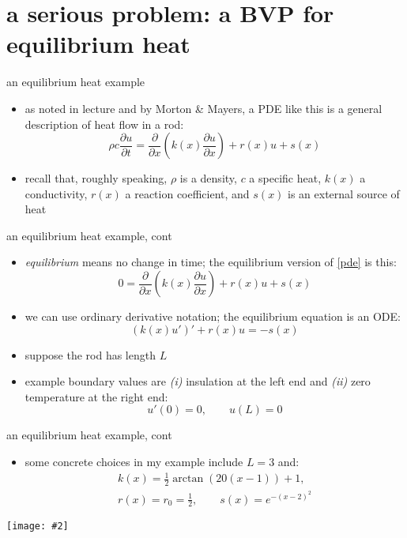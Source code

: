 \documentclass[10pt,hyperref]{beamer}
\newcommand{\ppt}[1]{\ensuremath{\frac{\partial #1}{\partial t}}}
\newcommand{\ppx}[1]{\ensuremath{\frac{\partial #1}{\partial x}}}
\newcommand{\centerimage}[2]{\begin{center}
\texttt{[image: \#2]}
\end{center}}
\begin{document}
\section[serious problem]{a serious problem: a BVP for equilibrium heat}


\begin{frame}{an equilibrium heat example} 

\begin{itemize}
\item as noted in lecture and by Morton \& Mayers, a PDE like this is a general description of heat flow in a rod:
\begin{equation}\label{pde}
\rho c \ppt{u} = \ppx{}\left(k(x) \ppx{u}\right) + r(x) u + s(x)
\end{equation}
\item recall that, roughly speaking, $\rho$ is a density, $c$ a specific heat, $k(x)$ a conductivity, $r(x)$ a reaction coefficient, and $s(x)$ is an external source of heat
\end{itemize}
\end{frame}

\begin{frame}{an equilibrium heat example, cont} 

\begin{itemize}
\item \emph{equilibrium} means no change in time; the equilibrium version of \eqref{pde} is this:
\begin{equation*}
0 = \ppx{}\left(k(x) \ppx{u}\right) + r(x) u + s(x)
\end{equation*}
\item we can use ordinary derivative notation; the equilibrium equation is an ODE:
\begin{equation}\label{seriousode}
\left(k(x) u'\right)' + r(x) u = - s(x)
\end{equation}
\item suppose the rod has length $L$
\item example boundary values are \emph{(i)} insulation at the left end and \emph{(ii)} zero temperature at the right end:
\begin{equation}\label{seriousbcs}
u'(0)=0, \qquad u(L)=0
\end{equation}
\end{itemize}
\end{frame}

\begin{frame}{an equilibrium heat example, cont} 

\begin{itemize}
\item some concrete choices in my example include $L=3$ and:
\begin{gather*}
k(x) = \frac{1}{2} \arctan(20 (x-1)) + 1, \\
r(x) = r_0 = \frac{1}{2}, \qquad s(x) = e^{-(x-2)^2}
\end{gather*}
\end{itemize}

\centerimage{0.7}{nonconstant-crop90}
\end{frame}
\end{document}
